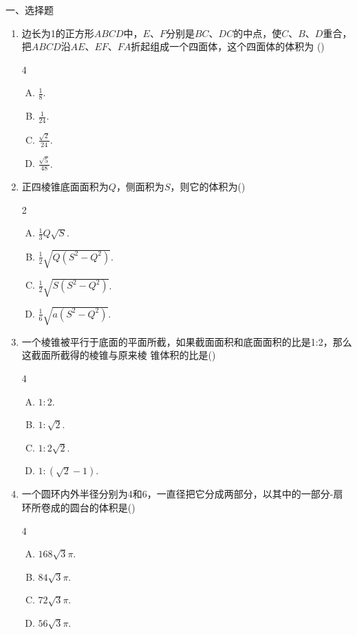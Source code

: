 一、选择题
\begin{enumerate}
    \item 边长为1的正方形$ABCD$中，$E$、$F$分别是$BC$、$DC$的中点，使$C$、$B$、$D$重合，把$ABCD$沿$AE$、$EF$、$FA$折起组成一个四面体，这个四面体的体积为 \hfill (\qquad )
\begin{multicols}{4}
\begin{enumerate}[(A)]
\item $\frac{1}{8}$.
\item $\frac{1}{24}$.
\item $\frac{\sqrt{2}}{24}$.
\item $\frac{\sqrt{5}}{48}$.
\end{enumerate}
\end{multicols}

\item 正四棱锥底面面积为$Q$，侧面积为$S$，则它的体积为\hfill (\qquad )
\begin{multicols}{2}
\begin{enumerate}[(A)]
\item $\frac{1}{3}Q\sqrt{S}$.
\item $\frac{1}{2}\sqrt{Q\left(S^{2}-Q^{2}\right)}$.
\item $\frac{1}{2}\sqrt{S\left(S^{2}-Q^{2}\right)}$.
\item $\frac{1}{6}\sqrt{a\left(S^{2}-Q^{2}\right)}$.
\end{enumerate}
\end{multicols}
\item 一个棱锥被平行于底面的平面所截，如果截面面积和底面面积的比是1:2，那么这截面所截得的棱锥与原来棱
锥体积的比是\hfill (\qquad )
\begin{multicols}{4}
\begin{enumerate}[(A)]
\item $1:2$.
\item $1:\sqrt{2}$.
\item $1:2\sqrt{2}$.
\item $1:(\sqrt{2}-1)$.
\end{enumerate}
\end{multicols}


\item 一个圆环内外半径分别为4和6，一直径把它分成两部分，以其中的一部分-扇环所卷成的圆台的体积是\hfill (\qquad )
\begin{multicols}{4}
\begin{enumerate}[(A)]
\item $168\sqrt{3}\pi $.
\item $84\sqrt{3}\pi$.
\item $72\sqrt{3}\pi $.
\item $56\sqrt{3}\pi$.
\end{enumerate}
\end{multicols}


\end{enumerate}
